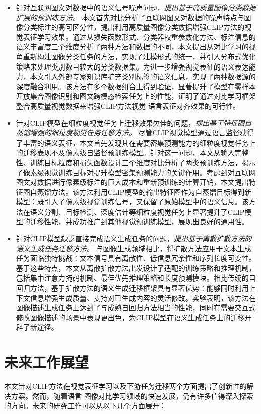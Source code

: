 \begin{itemize}
    \item 针对互联网图文对数据中的语义信号噪声问题，\textit{提出基于高质量图像分类数据扩展的预训练方法。} 本文首先对比分析了互联网图文对数据的噪声特点与图像分类标注的高可区分性，提出利用高质量图像分类数据增强CLIP方法的视觉表征学习效果。通过从损失函数形式、分类器权重参数化方法、标注信息的语义丰富度三个维度分析了两种方法和数据的不同，本文提出从对比学习的视角重新构建图像分类任务的方法，实现了建模形式的统一，并引入分布式优化策略来处理类别数目较大的分类数据集。为进一步增强视觉表征的语义表达能力，本文引入外部专家知识库扩充类别标签的语义信息，实现了两种数据源的深度融合利用。该方法在多个数据组合上得到验证，显著提升了模型在零样本开放集合图像识别和图文跨模态检索任务上的性能，证明了通过对比学习框架整合高质量视觉数据来增强CLIP方法视觉-语言表征对齐效果的可行性。
    
    \item 针对CLIP模型在细粒度视觉任务上迁移效果欠佳的问题，\textit{提出基于特征图自蒸馏增强的细粒度视觉任务迁移方法。} 尽管CLIP视觉模型通过语言监督获得了丰富的语义表征，本文首先发现其在需要密集预测能力的细粒度视觉任务上的迁移表现不及像素级自监督预训练模型。针对这一问题，本文从输入完整性、训练目标粒度和损失函数设计三个维度对比分析了两类预训练方法，揭示了像素级视觉训练目标对提升模型密集预测能力的关键作用。考虑到对互联网图文对数据进行像素级标注的巨大成本和重新预训练的计算开销，本文提出特征图自蒸馏方法。该方法利用CLIP模型的输出特征图作为自蒸馏目标得到新模型：既引入了像素级视觉训练信号，又保留了原始模型中的语义信息。该方法在语义分割、目标检测、深度估计等细粒度视觉任务上显著提升了CLIP模型的迁移性能，并成功推广到其他视觉预训练模型，展现出良好的通用性。

    \item 针对CLIP模型缺乏直接完成语义生成任务的问题，\textit{提出基于离散扩散方法的语义生成任务迁移方法。} 与图像生成领域相比，将扩散方法应用于文本生成任务面临独特挑战：文本信号具有离散性、低信息冗余性和序列长度可变性。基于这些特点，本文从离散扩散方法出发设计了适配的训练策略和推理机制，包括集中注意力掩码机制、最佳优先推理策略和长度预测模块。相比传统的自回归方法，基于扩散方法的语义生成迁移框架具有显著优势：能够同时利用上下文信息增强生成质量、支持对已生成内容的灵活修改。实验表明，该方法在图像描述生成任务上达到了与成熟自回归方法相当的性能，同时在需要交互式修改图像描述的场景中表现更出色，为CLIP模型在语义生成任务上的迁移开辟了新途径。
\end{itemize}

\section{未来工作展望}
本文针对CLIP方法在视觉表征学习以及下游任务迁移两个方面提出了创新性的解决方案。然而，随着语言-图像对比学习领域的快速发展，仍有许多值得深入探索的方向。未来的研究工作可以从以下几个方面展开：
